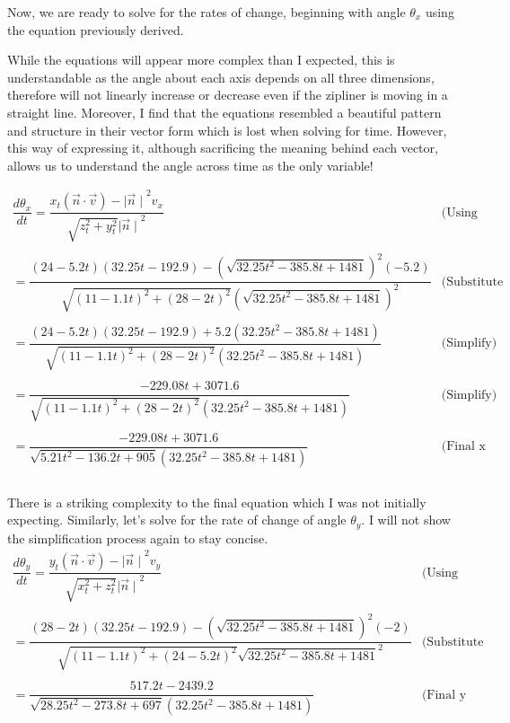 \documentclass[12pt]{article}
\begin{document}
\vspace{20pt}
Now, we are ready to solve for the rates of change, beginning with angle $\theta_x$ using the equation previously derived.

While the equations will appear more complex than I expected, this is understandable as the angle about each axis depends on all three dimensions, therefore will not linearly increase or decrease even if the zipliner is moving in a straight line. Moreover, I find that the equations resembled a beautiful pattern and structure in their vector form which is lost when solving for time. However, this way of expressing it, although sacrificing the meaning behind each vector, allows us to understand the angle across time as the only variable! 

$$
\begin{array}{l|c}
    \dfrac{d\theta_x}{dt} = \dfrac{x_t(\vec n \cdot \vec v) - {\mid \vec n \mid}^2 v_x}{\sqrt{z_t^2 + y_t^2} {\mid \vec n \mid}^2} & \text{(Using Equation 1)} \\ \\
    = \dfrac{(24-5.2t)(32.25t-192.9) - \left(\sqrt{32.25t^2 - 385.8t + 1481}\right)^2 (-5.2)}{\sqrt{(11-1.1t)^2 + (28-2t)^2} \left( \sqrt{32.25t^2 - 385.8t + 1481}\right)^2} & \text{(Substitute values)}\\ \\
    = \dfrac{(24-5.2t)(32.25t-192.9) + 5.2(32.25t^2 - 385.8t + 1481)}{\sqrt{(11-1.1t)^2 + (28-2t)^2} (32.25t^2 - 385.8t + 1481)} & \text{(Simplify)}\\ \\
    = \dfrac{-229.08t+3071.6}{\sqrt{(11-1.1t)^2 + (28-2t)^2} (32.25t^2 - 385.8t + 1481)} & \text{(Simplify)}\\ \\
    = \boxed{\dfrac{-229.08t+3071.6}{\sqrt{5.21t^2-136.2t+905} \left(32.25t^2 - 385.8t + 1481\right)}} & \text{(Final x equation)}\\
 \end{array} 
$$
\\
There is a striking complexity to the final equation which I was not initially expecting. Similarly, let's solve for the rate of change of angle $\theta_y$. I will not show the simplification process again to stay concise.
$$
\begin{array}{l|c}
    \dfrac{d\theta_y}{dt} = \dfrac{y_t(\vec n \cdot \vec v) - {\mid \vec n \mid}^2 v_y}{\sqrt{x_t^2 + z_t^2} {\mid \vec n \mid}^2} & \text{(Using Equation 2)}\\ \\
    = \dfrac{ (28-2t)(32.25t-192.9) - \left( \sqrt{32.25t^2 - 385.8t + 1481}\right)^2 (-2)}{\sqrt{(11-1.1t)^2 + (24-5.2t)^2} \sqrt{32.25t^2 - 385.8t + 1481}^2} & \text{(Substitute values)}\\ \\
    = \boxed{\dfrac{517.2t-2439.2}{\sqrt{28.25t^2-273.8t+697} \left(32.25t^2 - 385.8t + 1481\right)}} & \text{(Final y equation)}\\
 \end{array} 
$$
\end{document}
